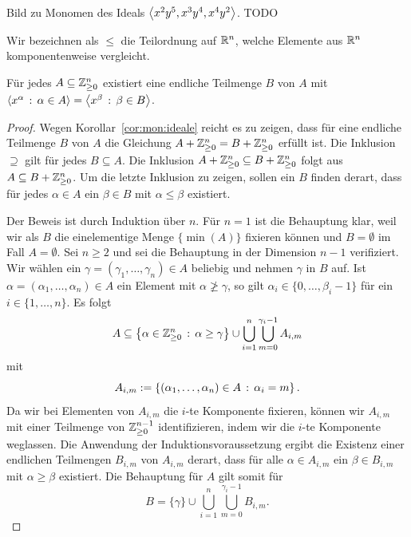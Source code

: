 \documentclass[11pt]{article}
\numberwithin{equation}{section}
\begin{document}
\begin{beispiel} 
	Bild zu Monomen des Ideals $\left<  x^2 y^5, x^3 y^4, x^4 y^2 \right>$. TODO 
\end{beispiel} 

Wir bezeichnen als $\le$ die Teilordnung auf $\mathbb{R}^n$, welche Elemente aus $\mathbb{R}^n$ komponentenweise vergleicht. 

\begin{theorem} \label{dickson}Für jedes $A \subseteq \mathbb{Z}_{\ge 0}^n$ existiert eine endliche Teilmenge $B$ von $A$ mit $\left<  x^\alpha \,:\, \alpha \in A \right> = \left<  x^\beta \, : \, \beta \in B \right>$. 
\end{theorem} 
\begin{proof} 
	Wegen Korollar~\ref{cor:mon:ideale} reicht es zu zeigen, dass für eine endliche Teilmenge $B$ von $A$ die Gleichung $A + \mathbb{Z}_{\ge 0}^n = B + \mathbb{Z}_{\ge 0}^n$ erfüllt ist. Die Inklusion $\supseteq$ gilt für jedes $B \subseteq A$. Die Inklusion $A + \mathbb{Z}_{\ge 0}^n \subseteq B+ \mathbb{Z}_{\ge 0}^n$ folgt aus $A \subseteq B + \mathbb{Z}_{\ge 0}^n$. Um die letzte Inklusion zu zeigen, sollen ein $B$ finden derart, dass für jedes $\alpha \in A$ ein $\beta \in B$ mit $\alpha  \le \beta$ existiert. 
	
	Der Beweis ist durch Induktion über $n$. Für $n=1$ ist die Behauptung klar, weil wir als $B$ die einelementige Menge $\{\min (A) \}$ fixieren können und $B = \emptyset$ im Fall $A = \emptyset$. Sei $n \ge 2$ und sei die Behauptung in der  Dimension $n-1$ verifiziert. Wir wählen ein $\gamma = (\gamma_1,\ldots,\gamma_n) \in A$ beliebig und nehmen $\gamma$ in $B$ auf. Ist $\alpha = (\alpha_1, \ldots, \alpha_n) \in A$ ein Element mit $\alpha \not\ge \gamma$, so gilt $\alpha_i \in \{0,\ldots, \beta_i -1\}$ für ein $i \in \{1,\ldots,n\}$. Es folgt 
	\[
		A \subseteq \left\{  \alpha \in \mathbb{Z}_{\ge 0}^n \,:\, \alpha \ge \gamma \right\} \cup \bigcup_{i=1}^n \bigcup_{m=0}^{\gamma_i - 1} A_{i,m}
	\]
	mit 
	\[
		A_{i,m} := \left\{  (\alpha_1,\ldots,\alpha_n) \in A \,:\,  \alpha_i = m \right\}. 
	\]
	Da wir bei Elementen von $A_{i,m}$ die $i$-te Komponente fixieren, können wir $A_{i,m}$ mit einer Teilmenge von $\mathbb{Z}_{\ge 0}^{n-1}$ identifizieren, indem wir die $i$-te Komponente weglassen. Die Anwendung der Induktionsvoraussetzung ergibt die Existenz einer endlichen Teilmengen $B_{i,m}$ von $A_{i,m}$ derart, dass für alle $\alpha \in A_{i,m}$ ein $\beta \in B_{i,m}$ mit $\alpha \ge \beta$ existiert. Die Behauptung für $A$ gilt somit für 
	\[	
			B = \{\gamma\} \cup \bigcup_{i=1}^n \bigcup_{m=0}^{\gamma_i -1} B_{i,m}. 
	\]
\end{proof} 
\end{document}
